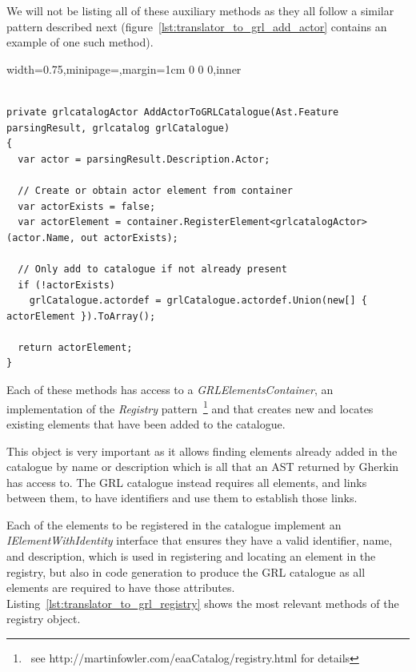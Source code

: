 \documentclass[dissertation,final]{softeng}
\newenvironment{featurecode}[1]
{ \lrbox\featurebox \begin{adjustbox}{width=#1\textwidth,minipage=\textwidth,margin=1cm 0 0 0,inner} }
{ \end{adjustbox}\endlrbox}
\newenvironment{featurelist}[2]
{
\newcommand{\setcaption}{\caption{#1}}
\newcommand{\setlabel}{\label{#2}}
}
{\begin{listing}[h!]\centering\usebox\featurebox\setcaption\setlabel\end{listing}}
\begin{document}
We will not be listing all of these auxiliary methods as they all follow a similar pattern described next (figure~\ref{lst:translator_to_grl_add_actor} contains an example of one such method).

\begin{featurelist}{Translator to GRL -- add actor to catalogue}{lst:translator_to_grl_add_actor}
\begin{featurecode}{0.75}
\begin{verbatim}

private grlcatalogActor AddActorToGRLCatalogue(Ast.Feature parsingResult, grlcatalog grlCatalogue)
{
  var actor = parsingResult.Description.Actor;

  // Create or obtain actor element from container
  var actorExists = false;
  var actorElement = container.RegisterElement<grlcatalogActor>(actor.Name, out actorExists);

  // Only add to catalogue if not already present
  if (!actorExists)
    grlCatalogue.actordef = grlCatalogue.actordef.Union(new[] { actorElement }).ToArray();

  return actorElement;
}
\end{verbatim}
\end{featurecode}
\end{featurelist}

Each of these methods has access to a \emph{GRLElementsContainer}, an implementation of the \emph{Registry} pattern~\footnote{~see http://martinfowler.com/eaaCatalog/registry.html for details} and that creates new and locates existing elements that have been added to the catalogue.

This object is very important as it allows finding elements already added in the catalogue by name or description which is all that an AST returned by Gherkin has access to. The GRL catalogue instead requires all elements, and links between them, to have identifiers and use them to establish those links.

Each of the elements to be registered in the catalogue implement an \emph{IElementWithIdentity} interface that ensures they have a valid identifier, name, and description, which is used in registering and locating an element in the registry, but also in code generation to produce the GRL catalogue as all elements are required to have those attributes. Listing~\ref{lst:translator_to_grl_registry} shows the most relevant methods of the registry object.
\end{document}
